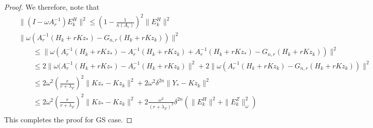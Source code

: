 \begin{itemize}
\begin{proof}
We therefore, note that 
\begin{eqnarray*}
&& \|(I - \omega A_r^{-1}) E_k^H \|^2 \leq  \left (1 - \frac{1}{\kappa(A_r)} \right )^2 \|E_k^H\|^2 \\
&& \|\omega (A_r^{-1}(H_k + rKz_* ) - G_{n,r}(H_k +rKz_k)) \|^2 \\
&& \qquad \leq \|\omega (A_r^{-1}(H_k + rKz_*) - A_r^{-1}(H_k + rKz_k) + A_r^{-1}(H_k + rKz_*) - G_{n,r}(H_k +rKz_k)) \|^2 \\
&& \qquad \leq 2 \|\omega (A_r^{-1}(H_k + rKz_* ) - A_r^{-1}(H_k + rKz_k)\|^2 + 2\|\omega(A_r^{-1}(H_k + rKz_k) - G_{n,r}(H_k +rKz_k)) \|^2 \\
&& \qquad \leq 2 \omega^2 \left ( \frac{r}{r + \lambda_F} \right )^2 \|Kz_* - Kz_k\|^2 + 2 \omega^2 \delta^{2n} \|Y_* - Kz_k\|^2 \\ 
&& \qquad \leq 2 \omega^2 \left ( \frac{r}{r + \lambda_F} \right )^2 \|Kz_* - Kz_k\|^2 + 2 \frac{\omega^2}{(r + \lambda_F)^2} \delta^{2n} \left ( \|E_k^H\|^2 + \|E_k^Z\|_\omega^2 \right ) \\ 
\end{eqnarray*}
This completes the proof for GS case. 
\end{proof} 




\end{itemize}
